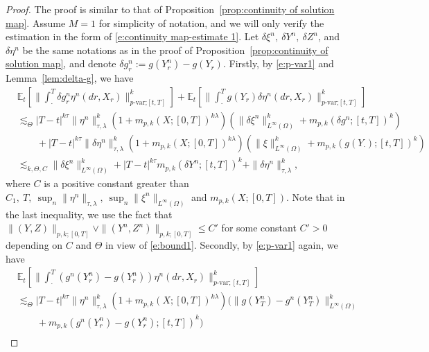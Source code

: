\documentclass[11pt,reqno]{amsart}
\numberwithin{equation}{section}
\begin{document}
\begin{proof} 
The proof is similar to that of  Proposition~\ref{prop:continuity of solution map}. Assume $M=1$ for simplicity of notation, and we will only verify the estimation in the form of \eqref{e:continuity map-estimate 1}. Let $\delta \xi^n,\ \delta Y^n,\  \delta Z^n$, and $\delta \eta^n$ be the same notations as in the proof of Proposition~\ref{prop:continuity of solution map}, and denote $\delta g^n_r := g(Y^n_r) - g(Y_r)$. Firstly, by \eqref{e:p-var1} and Lemma~\ref{lem:delta-g}, we have
\begin{equation*}
\begin{aligned}
&\mathbb{E}_{t}\left[\Big\| \int_{\cdot}^{T} \delta g^n_r\eta^{n}(dr,X_{r})\Big\|^{k}_{p\text{-var;}[t,T]}\right] + \mathbb{E}_{t}\left[\Big\| \int_{\cdot}^{T}g(Y_r)\delta \eta^{n}(dr,X_{r})\Big\|^{k}_{p\text{-var;}[t,T]}\right]\\
&\lesssim_{\Theta} |T-t|^{k\tau}\|\eta^{n}\|^{k}_{\tau,\lambda}\left(1 + m_{p,k}(X;[0,T])^{k\lambda}\right)\left(\|\delta \xi^n\|^k_{L^{\infty}(\Omega)} + m_{p,k}(\delta g^n;[t,T])^k\right)\\
&\qquad + |T-t|^{k\tau}\|\delta\eta^{n}\|^{k}_{\tau,\lambda}\left(1 + m_{p,k}(X;[0,T])^{k\lambda}\right) \left(\|\xi\|^{k}_{L^{\infty}(\Omega)} + m_{p,k}(g(Y_{\cdot});[t,T])^{k}\right)\\
&\lesssim_{k,\Theta,C} \|\delta\xi^{n}\|^{k}_{L^{\infty}(\Omega)} + |T-t|^{k\tau}m_{p,k}(\delta Y^{n};[t,T])^{k} + \|\delta \eta^{n}\|^{k}_{\tau,\lambda},
\end{aligned}
\end{equation*}
where $C$ is a positive constant greater than $C_1,\ T,\ \sup_{n}\|\eta^{n}\|_{\tau,\lambda},\  \sup_{n}\|\xi^{n}\|_{L^{\infty}(\Omega)}$ and $m_{p,k}(X;[0,T])$. 
Note that in the last inequality, we use the fact that $\|(Y,Z)\|_{p,k;[0,T]}\vee\|(Y^n,Z^n)\|_{p,k;[0,T]}\le C'$ for some constant $C'>0$ depending on $C$ and $\Theta$ in view of \eqref{e:bound1}.
Secondly, by \eqref{e:p-var1} again, we have
\begin{equation*}
\begin{aligned}
&\mathbb{E}_t\left[\Big\|\int_{\cdot}^{T}\left(g^{n}(Y^{n}_{r}) - g(Y^{n}_{r})\right)\eta^{n}(dr,X_r)\Big\|_{p\text{-var};[t,T]}^{k}\right]\\
&\lesssim_{\Theta} |T-t|^{k\tau}\|\eta^{n}\|^{k}_{\tau,\lambda}\left(1 + m_{p,k}(X;[0,T])^{k\lambda}\right)\Big(\|g(Y^n_{T}) - g^n(Y^n_{T})\|^k_{L^{\infty}(\Omega)}  \\
&\qquad + m_{p,k}(g^n(Y^n_{r}) - g(Y^n_{r});[t,T])^k\Big)\\

\end{aligned}
\end{equation*}
\end{proof}
\end{document}
